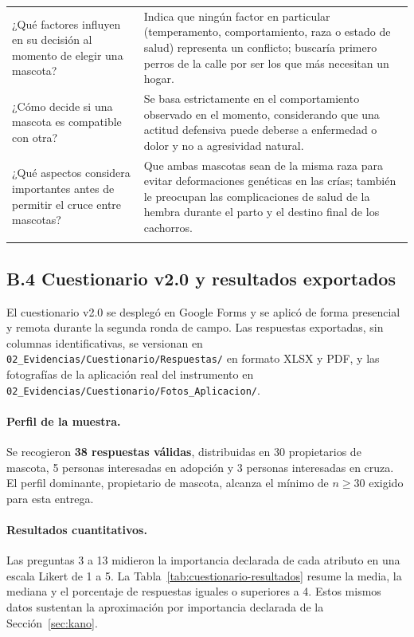 \documentclass[journal,onecolumn]{IEEEtran}
\begin{document}
{\begin{longtable}{@{}p{5.6cm} p{9.4cm}@{}}
			¿Qué factores influyen en su decisión al momento de elegir una mascota? & Indica que ningún factor en particular (temperamento, comportamiento, raza o estado de salud) representa un conflicto; buscaría primero perros de la calle por ser los que más necesitan un hogar. \\ \addlinespace
			
			¿Cómo decide si una mascota es compatible con otra? & Se basa estrictamente en el comportamiento observado en el momento, considerando que una actitud defensiva puede deberse a enfermedad o dolor y no a agresividad natural. \\ \addlinespace
			
			¿Qué aspectos considera importantes antes de permitir el cruce entre mascotas? & Que ambas mascotas sean de la misma raza para evitar deformaciones genéticas en las crías; también le preocupan las complicaciones de salud de la hembra durante el parto y el destino final de los cachorros. \\ \addlinespace
			
		\end{longtable}
	}
	
	\subsection*{B.4 Cuestionario v2.0 y resultados exportados}
	
	El cuestionario v2.0 se desplegó en Google Forms y se aplicó de forma
	presencial y remota durante la segunda ronda de campo. Las respuestas
	exportadas, sin columnas identificativas, se versionan en
	\texttt{02\_Evidencias/Cuestionario/Respuestas/} en formato XLSX y PDF, y las
	fotografías de la aplicación real del instrumento en
	\texttt{02\_Evidencias/Cuestionario/Fotos\_Aplicacion/}.
	
	\paragraph{Perfil de la muestra.}
	Se recogieron \textbf{38 respuestas válidas}, distribuidas en 30 propietarios
	de mascota, 5 personas interesadas en adopción y 3 personas interesadas en
	cruza. El perfil dominante, propietario de mascota, alcanza el mínimo de
	$n \geq 30$ exigido para esta entrega.
	
	\paragraph{Resultados cuantitativos.}
	Las preguntas 3 a 13 midieron la importancia declarada de cada atributo en
	una escala Likert de 1 a 5. La Tabla~\ref{tab:cuestionario-resultados}
	resume la media, la mediana y el porcentaje de respuestas iguales o
	superiores a 4. Estos mismos datos sustentan la aproximación por importancia
	declarada de la Sección~\ref{sec:kano}.
	
\end{document}
